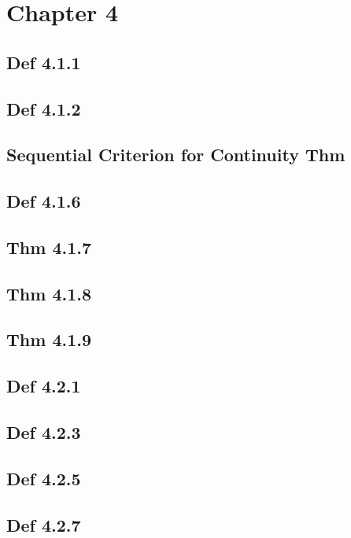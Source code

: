 \section*{Chapter 4}

\subsection*{Def 4.1.1}

\subsection*{Def 4.1.2}

\subsection*{Sequential Criterion for Continuity Thm}

\subsection*{Def 4.1.6}

\subsection*{Thm 4.1.7}

\subsection*{Thm 4.1.8}

\subsection*{Thm 4.1.9}

\subsection*{Def 4.2.1}

\subsection*{Def 4.2.3}

\subsection*{Def 4.2.5}

\subsection*{Def 4.2.7}

